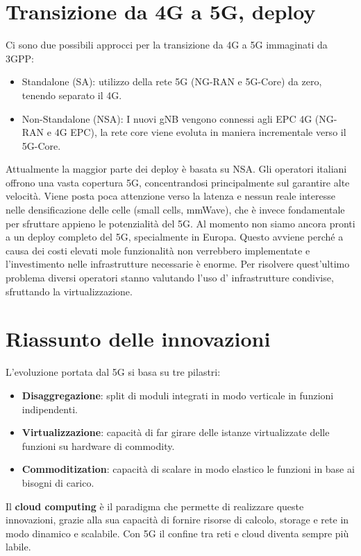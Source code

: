 \section{Transizione da 4G a 5G, deploy}
Ci sono due possibili approcci per la transizione da 4G a 5G immaginati da 3GPP:
\begin{itemize}
	\item Standalone (SA): utilizzo della rete 5G (NG-RAN e 5G-Core) da zero, tenendo separato il 4G.
	\item Non-Standalone (NSA): I nuovi gNB vengono connessi agli EPC 4G (NG-RAN e 4G EPC), la rete core viene evoluta in maniera incrementale verso il 5G-Core.
\end{itemize}
Attualmente la maggior parte dei deploy è basata su NSA. Gli operatori italiani offrono una vasta copertura 5G, concentrandosi principalmente sul garantire alte velocità.
Viene posta poca attenzione verso la latenza e nessun reale interesse nelle densificazione delle celle (small cells, mmWave), che è invece fondamentale per sfruttare appieno le potenzialità del 5G. Al momento non siamo ancora pronti a un deploy completo del 5G, specialmente in Europa. Questo avviene perché a causa dei costi elevati mole funzionalità non verrebbero implementate e l'investimento nelle infrastrutture necessarie è enorme. Per risolvere quest'ultimo problema diversi operatori stanno valutando l'uso d' infrastrutture condivise, sfruttando la virtualizzazione.
\section{Riassunto delle innovazioni}
L'evoluzione portata dal 5G si basa su tre pilastri:
\begin{itemize}
	\item \textbf{Disaggregazione}: split di moduli integrati in modo verticale in funzioni indipendenti.
	\item \textbf{Virtualizzazione}: capacità di far girare delle istanze virtualizzate delle funzioni su hardware di commodity.
	\item \textbf{Commoditization}: capacità di scalare in modo elastico le funzioni in base ai bisogni di carico.
\end{itemize}
Il \textbf{cloud computing} è il paradigma che permette di realizzare queste innovazioni, grazie alla sua capacità di fornire risorse di calcolo, storage e rete in modo dinamico e scalabile. Con 5G il confine tra reti e cloud diventa sempre più labile.